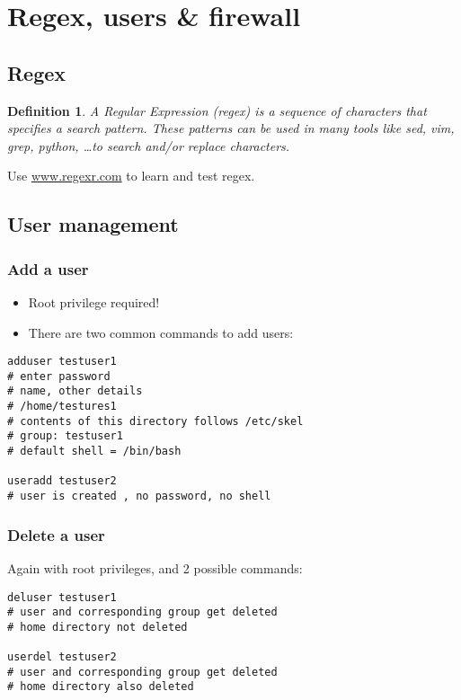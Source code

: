 \documentclass{article}
\newtheorem{theorem}{Definition}[section]
\begin{document}
\section{Regex, users \& firewall}

\subsection{Regex}

\begin{theorem}
    A Regular Expression (regex) is a sequence of characters that
    specifies a search pattern. These patterns can be used in 
    many tools like sed, vim, grep, python, \dots to search and/or replace characters.
\end{theorem}

Use \url{www.regexr.com} to learn and test regex.

\subsection{User management}

\subsubsection{Add a user}

\begin{itemize}
    \item Root privilege required!
    \item There are two common commands to add users:
\end{itemize}

\begin{verbatim}
adduser testuser1
# enter password
# name, other details
# /home/testures1
# contents of this directory follows /etc/skel
# group: testuser1
# default shell = /bin/bash

useradd testuser2
# user is created , no password, no shell
\end{verbatim}

\subsubsection{Delete a user}

Again with root privileges, and 2 possible commands:

\begin{verbatim}
deluser testuser1
# user and corresponding group get deleted
# home directory not deleted

userdel testuser2
# user and corresponding group get deleted
# home directory also deleted
\end{verbatim}
\end{document}
